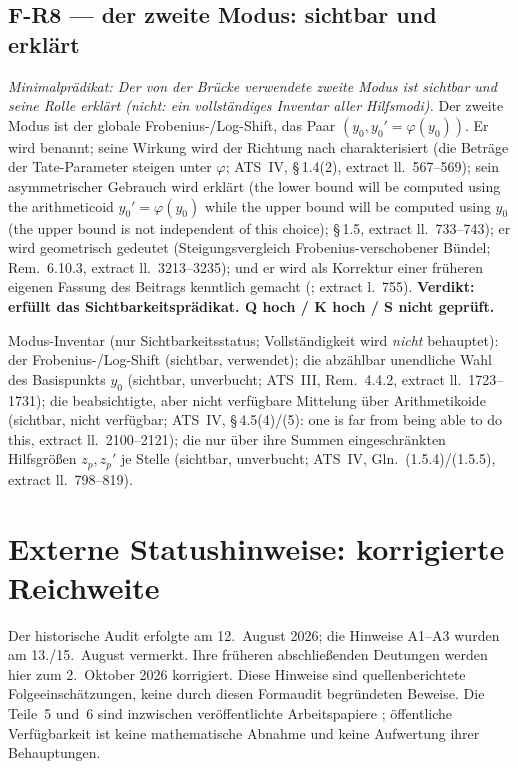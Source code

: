 \documentclass[11pt,a4paper]{article}
\begin{document}
\subsection{F-R8 --- der zweite Modus: sichtbar und erklärt}\label{sec:r8}

\emph{Minimalprädikat: Der von der Brücke verwendete zweite Modus ist sichtbar
und seine Rolle erklärt (nicht: ein vollständiges Inventar aller Hilfsmodi).}
Der zweite Modus ist der globale Frobenius-/Log-Shift, das Paar
$(y_0, y_0' = \varphi(y_0))$. Er wird benannt; seine Wirkung wird der Richtung
nach charakterisiert (die Beträge der Tate-Parameter steigen unter $\varphi$;
ATS~IV, \S\,1.4(2), extract ll.~567--569); sein asymmetrischer Gebrauch wird
erklärt (\glqq the lower bound will be computed using the arithmeticoid
$y_0'=\varphi(y_0)$ while the upper bound will be computed using $y_0$ (the
upper bound is not independent of this choice)\grqq{}; \S\,1.5, extract
ll.~733--743); er wird geometrisch gedeutet (Steigungsvergleich
Frobenius-verschobener Bündel; Rem.~6.10.3, extract ll.~3213--3235); und er
wird als Korrektur einer früheren eigenen Fassung des Beitrags kenntlich
gemacht (\grqq{}; extract l.~755). \textbf{Verdikt: erfüllt das
Sichtbarkeitsprädikat. Q hoch / K hoch / S nicht geprüft.}

Modus-Inventar (nur Sichtbarkeitsstatus; Vollständigkeit wird \emph{nicht}
behauptet): der Frobenius-/Log-Shift (sichtbar, verwendet); die abzählbar
unendliche Wahl des Basispunkts $y_0$ (sichtbar, unverbucht; ATS~III,
Rem.~4.4.2, extract ll.~1723--1731); die beabsichtigte, aber nicht verfügbare
Mittelung über Arithmetikoide (sichtbar, nicht verfügbar; ATS~IV,
\S\,4.5(4)/(5): \glqq one is far from being able to do this\grqq{}, extract
ll.~2100--2121); die nur über ihre Summen eingeschränkten Hilfsgrößen
$z_p, z_p'$ je Stelle (sichtbar, unverbucht; ATS~IV, Gln.~(1.5.4)/(1.5.5),
extract ll.~798--819).

\section{Externe Statushinweise: korrigierte Reichweite}\label{sec:notices}

Der historische Audit erfolgte am 12.~August 2026; die Hinweise
A1--A3 wurden am 13./15.~August vermerkt. Ihre früheren abschließenden
Deutungen werden hier zum 2.~Oktober 2026 korrigiert. Diese Hinweise
sind quellenberichtete Folgeeinschätzungen, keine durch diesen
Formaudit begründeten Beweise. Die Teile~5 und~6 sind inzwischen
veröffentlichte Arbeitspapiere \cite{part5,part6}; öffentliche
Verfügbarkeit ist keine mathematische Abnahme und keine
Aufwertung ihrer Behauptungen.
\end{document}
